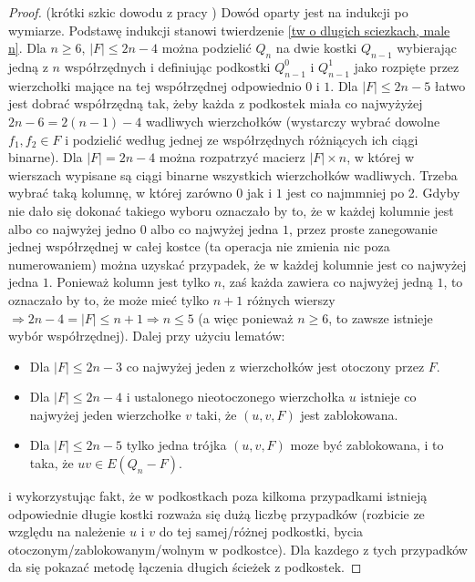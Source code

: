 \documentclass{pracamgr}
\begin{document}
    \begin{proof}
     (krótki szkic dowodu z pracy \cite{FG})\newline
     Dowód oparty jest na indukcji po wymiarze.
     Podstawę indukcji stanowi twierdzenie \ref{tw o dlugich sciezkach, male n}.%
     Dla $n\ge6$, $|F|\le 2n-4$ można podzielić $Q_n$ na dwie kostki $Q_{n-1}$ wybierając jedną z $n$ współrzędnych 
     i definiując podkostki $Q^0_{n-1}$ i $Q^1_{n-1}$ jako rozpięte przez wierzchołki mające na tej współrzędnej odpowiednio $0$ i $1$.
     Dla $|F|\le 2n-5$ łatwo jest dobrać współrzędną tak, żeby każda z podkostek miała co najwyżyżej $2n-6=2(n-1)-4$ wadliwych wierzchołków
     (wystarczy wybrać dowolne $f_1,f_2\in F$ i podzielić według jednej ze współrzędnych różniących ich ciągi binarne).
     Dla $|F|=2n-4$ można rozpatrzyć macierz $|F|\times n$, w której w wierszach wypisane są ciągi binarne wszystkich wierzchołków wadliwych.
     Trzeba wybrać taką kolumnę, w której zarówno $0$ jak i $1$ jest co najmmniej po 2. Gdyby nie dało się dokonać takiego wyboru oznaczało by to, że
     w każdej kolumnie jest albo co najwyżej jedno $0$ albo co najwyżej jedna $1$, przez proste zanegowanie jednej współrzędnej w całej kostce
     (ta operacja nie zmienia nic poza numerowaniem) można uzyskać przypadek, że w każdej kolumnie jest co najwyżej jedna $1$. 
     Ponieważ kolumn jest tylko $n$, zaś każda zawiera co najwyżej jedną $1$, to oznaczało by to, że może mieć tylko $n+1$ różnych wierszy
     $\Rightarrow 2n-4=|F|\le n+1\Rightarrow n\le5$ (a więc ponieważ $n\ge 6$, to zawsze istnieje wybór współrzędnej).\newline
     Dalej przy użyciu lematów:
     \begin{itemize}
      \item Dla $|F|\le 2n-3$ co najwyżej jeden z wierzchołków jest otoczony przez $F$.
      \item Dla $|F|\le 2n-4$ i ustalonego nieotoczonego wierzchołka $u$ istnieje co najwyżej jeden wierzchołke $v$ taki, że $(u,v,F)$ jest zablokowana.
      \item Dla $|F|\le 2n-5$ tylko jedna trójka $(u,v,F)$ moze być zablokowana, i to taka, że $uv\in E(Q_n-F)$.
     \end{itemize}
     i wykorzystując fakt, że w podkostkach poza kilkoma przypadkami istnieją odpowiednie długie kostki rozważa się dużą liczbę przypadków
     (rozbicie ze względu na należenie $u$ i $v$ do tej samej/różnej podkostki, bycia otoczonym/zablokowanym/wolnym w podkostce).
     Dla kazdego z tych przypadków da się pokazać metodę łączenia długich ścieżek z podkostek.
    \end{proof}
\end{document}
